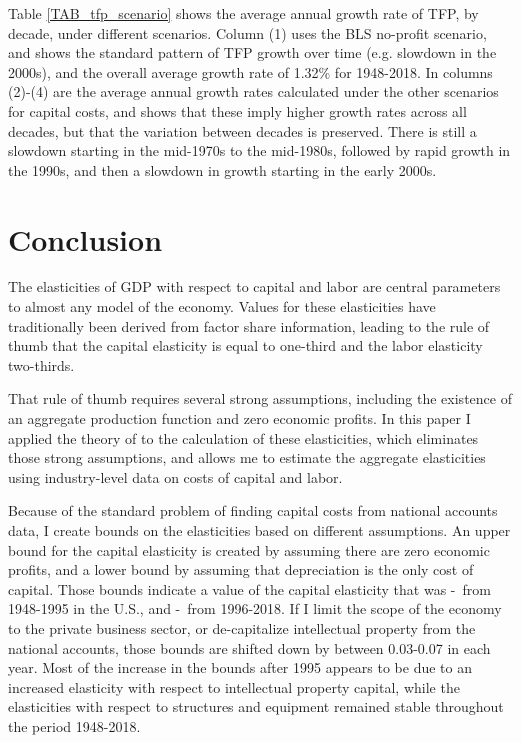 \documentclass[11pt]{article}
\begin{document}
Table \ref{TAB_tfp_scenario} shows the average annual growth rate of TFP, by decade, under different scenarios. Column (1) uses the BLS no-profit scenario, and shows the standard pattern of TFP growth over time (e.g. slowdown in the 2000s), and the overall average growth rate of 1.32\% for 1948-2018. In columns (2)-(4) are the average annual growth rates calculated under the other scenarios for capital costs, and shows that these imply higher growth rates across all decades, but that the variation between decades is preserved. There is still a slowdown starting in the mid-1970s to the mid-1980s, followed by rapid growth in the 1990s, and then a slowdown in growth starting in the early 2000s.

\section{Conclusion}
The elasticities of GDP with respect to capital and labor are central parameters to almost any model of the economy. Values for these elasticities have traditionally been derived from factor share information, leading to the rule of thumb that the capital elasticity is equal to one-third and the labor elasticity two-thirds. 

That rule of thumb requires several strong assumptions, including the existence of an aggregate production function and zero economic profits. In this paper I applied the theory of \cite{bfshortnote,bfprodge} to the calculation of these elasticities, which eliminates those strong assumptions, and allows me to estimate the aggregate elasticities using industry-level data on costs of capital and labor. 

Because of the standard problem of finding capital costs from national accounts data, I create bounds on the elasticities based on different assumptions. An upper bound for the capital elasticity is created by assuming there are zero economic profits, and a lower bound by assuming that depreciation is the only cost of capital. Those bounds indicate a value of the capital elasticity that was \baseearlydepr-\baseearlynoprofit \ from 1948-1995 in the U.S., and \baselatedepr-\baselatenoprofit \ from 1996-2018. If I limit the scope of the economy to the private business sector, or de-capitalize intellectual property from the national accounts, those bounds are shifted down by between 0.03-0.07 in each year. Most of the increase in the bounds after 1995 appears to be due to an increased elasticity with respect to intellectual property capital, while the elasticities with respect to structures and equipment remained stable throughout the period 1948-2018.
\end{document}
